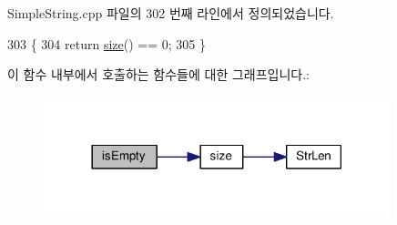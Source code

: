 Simple\+String.\+cpp 파일의 302 번째 라인에서 정의되었습니다.


\begin{DoxyCode}
303 \{
304     \textcolor{keywordflow}{return} \hyperlink{class_simple_string_aac782da1f912bceb5d8ad00c8dc892ac}{size}() == 0;
305 \}
\end{DoxyCode}


이 함수 내부에서 호출하는 함수들에 대한 그래프입니다.\+:
\nopagebreak
\begin{figure}[H]
\begin{center}
\leavevmode
\includegraphics[width=285pt]{class_simple_string_a479432127ee77145cc19d6a2d1590821_cgraph}
\end{center}
\end{figure}




